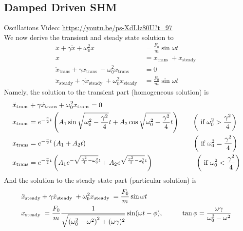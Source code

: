\documentclass{article}
\begin{document}
\subsection{Damped Driven SHM}
Oscillations Video: \url{https://youtu.be/ps-XdLlz80U?t=97}\\[10pt]
We now derive the transient and steady state solution to 
\begin{align}
\ddot{x}+\gamma \dot{x}+\omega_0^2 x&=\frac{F_0}{m} \sin \omega t \\
x&=x_{\text {trans }}+x_{\text {steady }} \\
\ddot{x}_{\text {trans}}+\gamma \dot{x}_{\text {trans }}+\omega_0^2 x_{\text {trans }}&=0 \\
\ddot{x}_{\text {steady}}+\gamma \dot{x}_{\text {steady }}+\omega_0^2 x_{\text {steady }}&=\frac{F_0}{m} \sin \omega t 
\end{align}
Namely, the solution to the transient part (homogeneous solution) is 
\begin{align}
&\ddot{x}_{\text{trans}}+\gamma \dot{x}_{\text{trans}}+\omega_0^2 x_{\text{trans}}=0 \notag \\
&x_{\text{trans}}=e^{-\frac{\gamma}{2} t}\left(A_1 \sin \sqrt{\omega_0^2-\frac{\gamma^2}{4}} t+A_2 \cos \sqrt{\omega_0^2-\frac{\gamma^2}{4} }t\right)\qquad \left(\text { if } \omega_0^2>\frac{\gamma^2}{4}\right) \notag \\
&x_{\text{trans}}=e^{-\frac{\gamma}{2} t}\left(A_1+A_2 t\right)\quad \quad \quad \quad \quad \quad \quad \quad \quad \ \quad \quad \quad \quad \ \qquad \left(\text { if } \omega_0^2=\frac{\gamma^2}{4}\right) \notag \\
&x_{\text{trans}}=e^{-\frac{\gamma}{2} t}\left(A_1 e^{-\sqrt{\frac{\gamma^2}{4}-\omega_0^2 }t}+A_2 e^{\sqrt{\frac{\gamma^2}{4}-\omega_0^2} t}\right) \quad \quad \quad \quad \ \qquad\left(\text { if } \omega_0^2<\frac{\gamma^2}{4}\right) \notag 
\end{align}
And the solution to the steady state part (particular solution) is 
\begin{align}
& \ddot{x}_{\text {steady}}+\gamma \dot{x}_{\text {steady }}+\omega_0^2 x_{\text {steady }}=\frac{F_0}{m} \sin \omega t  \\
& x_{\text {steady }}=\frac{F_0}{m} \frac{1}{\sqrt{\left(\omega_0^2-\omega^2\right)^2+(\omega \gamma)^2}} \sin (\omega t-\phi),& \quad \quad \tan \phi=\frac{\omega \gamma}{\omega_0^2-\omega^2} \notag 
\end{align}
\end{document}
